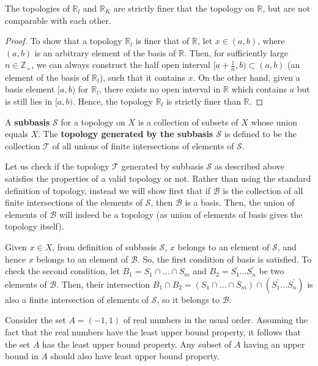 \documentclass[a4paper,english,12pt]{article}
\newcommand{\Real}{\mathbb{R}}
\newcommand{\Integer}{\mathbb{Z}}
\newcommand{\B}{\mathcal{B}}
\newcommand{\T}{\mathcal{T}}
\begin{document}
\begin{lem}
The topologies of $\Real_{l}$ and $\Real_{K}$ are strictly finer that the topology on $\Real$, but are not comparable with each other.
\end{lem}
\begin{proof}
To show that a topology $\Real_{l}$ is finer that of $\Real$, let $x \in (a, b)$, where $(a, b)$ is an arbitrary element of the basis of $\Real$. Then, for sufficiently large $n \in \Integer_{+}$, we can always construct the half open interval $[a + \frac{1}{n}, b) \subset (a,b)$ (an element of the basis of $\Real_{l}$), such that it contains $x$. On the other hand, given a basis element $[a, b)$ for $\Real_{l}$, there exists no open interval in $\Real$ which contains $a$ but is still lies in $[a,b)$. Hence, the topology $\Real_{l}$ is strictly finer than $\Real$.
\end{proof}

\begin{defn} [Subbasis]
A \textbf{subbasis} $\mathcal{S}$ for a topology on $X$ is a collection of subsets of $X$ whose union equals $X$. The \textbf{topology generated by the subbasis $\mathcal{S}$} is defined to be the collection $\T$ of all unions of finite intersections of elements of $\mathcal{S}$.
\end{defn}

Let us check if the topology $\T$ generated by subbasis $\mathcal{S}$ as described above satisfies the properties of a valid topology or not.
Rather than using the standard definition of topology, instead we will show first that if $\B$ is the collection of all finite intersections of the elements of $\mathcal{S}$, then $\B$ is a basis. Then, the union of elements of $\B$ will indeed be a topology (as union of elements of basis gives the topology itself).

Given $x \in X$, from definition of subbasis $\mathcal{S}$, $x$ belongs to an element of $\mathcal{S}$, and hence $x$ belongs to an element of $\B$. So, the first condition of basis is satisfied. To check the second condition, let $B_{1} = S_{1} \cap \dots \cap S_{m}$ and $B_{2} = S_{1}^{'} \dots S_{n}^{'}$ be two elements of $\B$. Then, their intersection $B_{1} \cap B_{2} = (S_{1} \cap \dots \cap S_{m})  \cap (S_{1}^{'} \dots S_{n}^{'})$ is also a finite intersection of elements of $\mathcal{S}$, so it belongs to $\B$. 

\begin{exmp}
\begin{enumerate}[i)]
Consider the set $A = (-1, 1)$ of real numbers in the usual order. Assuming the fact that the real numbers have the least upper bound property, it follows that the set $A$ has the least upper bound property. Any subset of $A$ having an upper bound in $A$ should also have least upper bound property. 
\end{enumerate}
\end{exmp}
\end{document}
